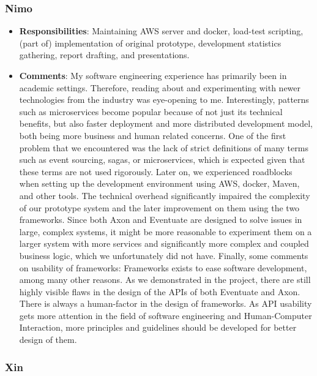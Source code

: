 \subsubsection{Nimo}
\begin{itemize}
    \item \textbf{Responsibilities}: Maintaining AWS server and docker, load-test scripting, (part of) implementation of original prototype, development statistics gathering, report drafting, and presentations.
    \item \textbf{Comments}: My software engineering experience has primarily been in academic settings. Therefore, reading about and experimenting with newer technologies from the industry was eye-opening to me. Interestingly, patterns such as microservices become popular because of not just its technical benefits, but also faster deployment and more distributed development model, both being more business and human related concerns. One of the first problem that we encountered was the lack of strict definitions of many terms such as event sourcing, sagas, or microservices, which is expected given that these terms are not used rigorously. Later on, we experienced roadblocks when setting up the development environment using AWS, docker, Maven, and other tools. The technical overhead significantly impaired the complexity of our prototype system and the later improvement on them using the two frameworks. Since both Axon and Eventuate are designed to solve issues in large, complex systems, it might be more reasonable to experiment them  on a larger system with more services and significantly more complex and coupled business logic, which we unfortunately did not have. Finally, some comments on usability of frameworks: Frameworks exists to ease software development, among many other reasons. As we demonstrated in the project, there are still highly visible flaws in the design of the APIs of both Eventuate and Axon. There is always a human-factor in the design of frameworks. As API usability \cite{daughtry2009api} gets more attention in the field of software engineering and Human-Computer Interaction, more principles and guidelines should be developed for better design of them.

\end{itemize}

\subsubsection{Xin}

